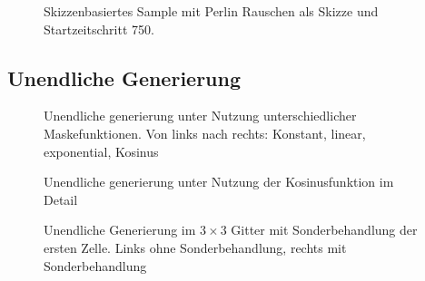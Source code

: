 \begin{figure}[htbp]
    \centering
    \caption{Skizzenbasiertes Sample mit Perlin Rauschen als Skizze und Startzeitschritt 750.}
    \label{fig:sketch_perlin}
\end{figure}




\subsection {Unendliche Generierung}


\begin{figure}[htbp]
    \centering
    \caption{Unendliche generierung unter Nutzung unterschiedlicher Maskefunktionen. Von links nach rechts: Konstant, linear, exponential, Kosinus}
    \label{fig:masks}
\end{figure}

\begin{figure}[htbp]
    \centering
    \caption{Unendliche generierung unter Nutzung der Kosinusfunktion im Detail}
    \label{fig:cos_detail}
\end{figure}

\begin{figure}[htbp]
    \centering
    \caption{Unendliche Generierung im $3\times3$ Gitter mit Sonderbehandlung der ersten Zelle. Links ohne Sonderbehandlung, rechts mit Sonderbehandlung}
    \label{fig:1st_regen}
\end{figure}

